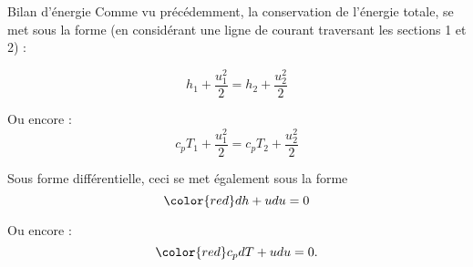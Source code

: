 %
%
%
%
%
%
%

\begin{frame}{Bilan d'énergie}
\small
Comme vu précédemment, la conservation de l'énergie totale, se met sous la forme 
 (en considérant une ligne de courant traversant les sections 1 et 2) :

$$
h_1  + \frac{u_1^2}{2} = h_2  + \frac{u_2^2}{2}
$$

Ou encore : 
$$
c_p T_1  + \frac{u_1^2}{2} = c_p T_2  + \frac{u_2^2}{2}
$$

\pause
\bigskip

Sous forme différentielle, ceci se met également sous la forme 
$$
\color{red} dh + u du = 0
$$  

Ou encore : 
$$\color{red}c_p dT + u du = 0.$$
\end{frame}


%
%
%
%
%
%
%
%
%
%
%

